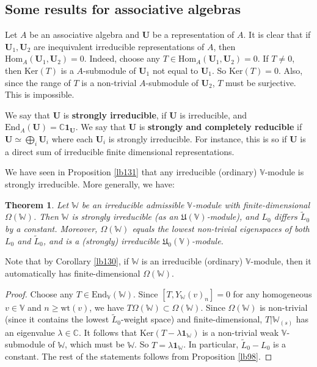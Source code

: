 \documentclass[12pt,a4paper,notitlepage]{report}
\theoremstyle{definition}
\theoremstyle{plain}
\newtheorem{thm}[df]{Theorem}
\newcommand{\fk}{\mathfrak}
\newcommand{\wtd}{\widetilde}
\newcommand{\End}{\mathrm{End}} %
\newcommand{\id}{\mathbf{1}}
\newcommand{\Hom}{\mathrm{Hom}}
\newcommand{\mbf}{\mathbf}
\newcommand{\Vbb}{\mathbb V}
\newcommand{\Wbb}{\mathbb W}
\newcommand{\Cbb}{\mathbb C}
\newcommand{\wt}{\mathrm{wt}}
\newcommand{\Ker}{\mathrm{Ker}}
\numberwithin{equation}{section}
\begin{document}
\subsection*{Some results for associative algebras}


Let $A$ be an associative algebra and $\mbf U$ be a representation of $A$. It is clear that if $\mbf U_1,\mbf U_2$ are inequivalent irreducible representations of $A$, then $\Hom_A(\mbf U_1,\mbf U_2)=0$. Indeed, choose any $T\in\Hom_A(\mbf U_1,\mbf U_2)=0$. If $T\neq 0$, then $\Ker(T)$ is a  $A$-submodule of $\mbf U_1$ not equal to $\mbf U_1$. So $\Ker(T)=0$. Also, since the range of $T$ is a non-trivial $A$-submodule of $\mbf U_2$, $T$ must be surjective. This is impossible.


We say that $\mbf U$ is \textbf{strongly irreducible}, if $\mbf U$ is irreducible, and $\End_A(\mbf U)=\Cbb\id_{\mbf U}$. We say that $\mbf U$ is \textbf{strongly and completely reducible} if $\mbf U\simeq\bigoplus_i\mbf U_i$ where each $\mbf U_i$ is strongly irreducible. For instance, this is so if $\mbf U$ is a direct sum of irreducible finite dimensional representations. 

We have seen in Proposition \ref{lb131} that any irreducible (ordinary) $\Vbb$-module is strongly irreducible. More generally, we have:

\begin{thm}\label{lb108}
Let $\Wbb$ be an irreducible admissible $\Vbb$-module with finite-dimensional $\Omega(\Wbb)$. Then $\Wbb$ is strongly irreducible (as an $\fk U(\Vbb)$-module), and $L_0$ differs $\wtd L_0$ by a constant. Moreover, $\Omega(\Wbb)$ equals the lowest non-trivial eigenspaces of both $L_0$ and $\wtd L_0$, and is a (strongly) irreducible $\fk U_0(\Vbb)$-module.
\end{thm}

Note that by Corollary \ref{lb130}, if $\Wbb$ is an irreducible (ordinary) $\Vbb$-module, then it automatically has finite-dimensional $\Omega(\Wbb)$.


\begin{proof}
Choose any $T\in\End_\Vbb(\Wbb)$. Since $[T,Y_\Wbb(v)_n]=0$ for any homogeneous $v\in\Vbb$ and $n\geq\wt(v)$, we have $T\Omega(\Wbb)\subset\Omega(\Wbb)$. Since $\Omega(\Wbb)$ is non-trivial (since it contains the lowest $\wtd L_0$-weight space) and finite-dimensional, $T|\Wbb_{(s)}$ has an eigenvalue $\lambda\in\Cbb$. It follows that $\Ker(T-\lambda\id_\Wbb)$ is a non-trivial weak $\Vbb$-submodule of $\Wbb$, which must be $\Wbb$. So $T=\lambda\id_\Wbb$. In particular, $\wtd L_0-L_0$ is a constant. The rest of the statements follows from Proposition \ref{lb98}.
\end{proof}
\end{document}
